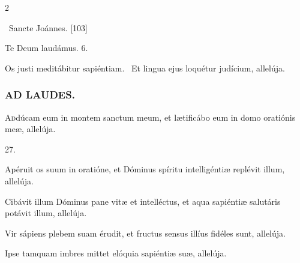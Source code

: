 \documentclass[9pt,twoside]{extarticle}
\begin{document}
\begin{multicols}{2}
{{\begin{tightlist}{}
\item {}~Sancte Joánnes. [103]
\item Te Deum laudámus. 6.
\item {} Os justi meditábitur sapiéntiam. ~Et lingua ejus loquétur judícium, allelúja.
\end{tightlist}

\subsubsection*{\center \textsc{AD LAUDES.}}
\begin{center}\end{center}
\lettrine{A}ddúcam eum in montem sanctum meum, et lætificábo eum in domo oratiónis meæ, allelúja.

\begin{tightlist}{}
\item {} 27.
\item {} Apéruit os suum in oratióne, et Dóminus spíritu intelligéntiæ replévit illum, allelúja.
\item {} Cibávit illum Dóminus pane vitæ et intelléctus, et aqua sapiéntiæ salutáris potávit illum, allelúja.
\item {} Vir sápiens plebem suam érudit, et fructus sensus illíus fidéles sunt, allelúja.
\item {} Ipse tamquam imbres mittet elóquia sapiéntiæ suæ, allelúja.
\end{tightlist}

}}
\end{multicols}
\end{document}
